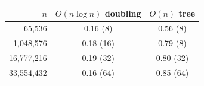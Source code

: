 \begin{tabular}{rcc}
\toprule
$n$ & $O(n\log n)$ doubling & $O(n)$ tree \\
\midrule
65,536 & 0.16 (8) & 0.56 (8) \\
1,048,576 & 0.18 (16) & 0.79 (8) \\
16,777,216 & 0.19 (32) & 0.80 (32) \\
33,554,432 & 0.16 (64) & 0.85 (64) \\
\bottomrule
\end{tabular}
